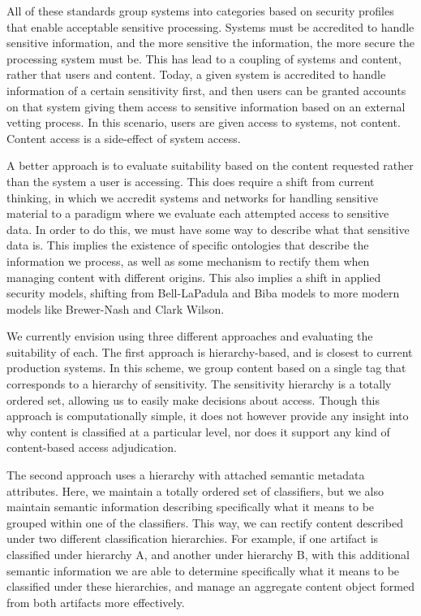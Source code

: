 \documentclass[10pt,letterpaper]{article}
\begin{document}
All of these standards group systems into categories based on security profiles that enable acceptable sensitive processing.  Systems must be accredited to handle sensitive information, and the more sensitive the information, the more secure the processing system must be.  This has lead to a coupling of systems and content, rather that users and content.  Today, a given system is accredited to handle information of a certain sensitivity first, and then users can be granted accounts on that system giving them access to sensitive information based on an external vetting process.  In this scenario, users are given access to systems, not content. Content access is a side-effect of system access.

A better approach is to evaluate suitability based on the content requested rather than the system a user is accessing.  This does require a shift from current thinking, in which we accredit systems and networks for handling sensitive material to a paradigm where we evaluate each attempted access to sensitive data.  In order to do this, we must have some way to describe what that sensitive data is.  This implies the existence of specific ontologies that describe the information we process, as well as some mechanism to rectify them when managing content with different origins.  This also implies a shift in applied security models, shifting from Bell-LaPadula and Biba models to more modern models like Brewer-Nash and Clark Wilson.

We currently envision using three different approaches and evaluating the suitability of each.  The first approach is hierarchy-based, and is closest to current production systems.  In this scheme, we group content based on a single tag that corresponds to a hierarchy of sensitivity.  The sensitivity hierarchy is  a totally ordered set, allowing us to easily make decisions about access.  Though this approach is computationally simple, it does not however provide any insight into why content is classified at a particular level, nor does it support any kind of content-based access adjudication.

The second approach uses a hierarchy with attached semantic metadata attributes.  Here, we maintain a totally ordered set of classifiers, but we also maintain semantic information describing specifically what it means to be grouped within one of the classifiers.  This way, we can rectify content described under two different classification hierarchies.  For example, if one artifact is classified under hierarchy A, and another under hierarchy B, with this additional semantic information we are able to determine specifically what it means to be classified under these hierarchies, and manage an aggregate content object formed from both artifacts more effectively.
\end{document}
